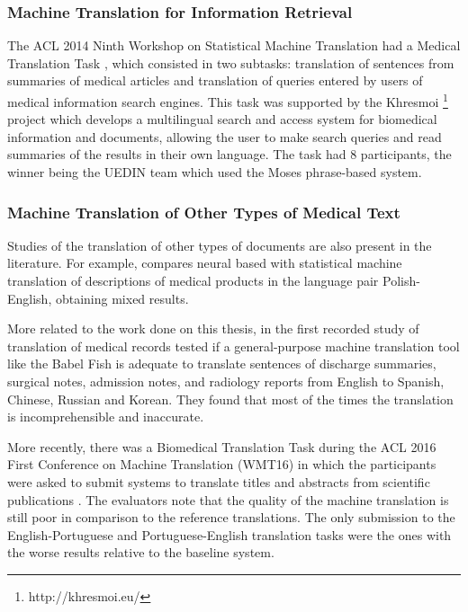\subsubsection{Machine Translation for Information Retrieval}

The ACL 2014 Ninth Workshop on Statistical Machine Translation had a Medical Translation Task \citep{Bojar2014}, which consisted in two subtasks: translation of sentences from summaries of medical articles and translation of queries entered by users of medical information search engines. This task was supported by the Khresmoi \footnote{http://khresmoi.eu/} project which develops a multilingual search and access system for biomedical information and documents, allowing the user to make search queries and read summaries of the results in their own language. The task had 8 participants, the winner being the UEDIN team \citep{Durrani2014} which used the Moses phrase-based system. 

\subsubsection{Machine Translation of Other Types of Medical Text}

Studies of the translation of other types of documents are also present in the literature. For example, \citep{Wok2015} compares neural based with statistical machine translation of descriptions of medical products in the language pair Polish-English, obtaining mixed results.

More related to the work done on this thesis, in the first recorded study of translation of medical records \citep{Zeng-Treitler2010} tested if a general-purpose machine translation tool like the Babel Fish is adequate to translate sentences of discharge summaries, surgical notes, admission notes, and radiology reports from English to Spanish, Chinese, Russian and Korean. They found that most of the times the translation is incomprehensible and inaccurate.

More recently, there was a Biomedical Translation Task during the ACL 2016 First Conference on Machine Translation (WMT16) in which the participants were asked to submit systems to translate titles and abstracts from scientific publications \citep{Bojar2016}. The evaluators note that the quality of the machine translation is still poor in comparison to the reference translations. The only submission to the English-Portuguese  and Portuguese-English translation tasks \citep{Aires2016} were the ones with the worse results relative to the baseline system. 

